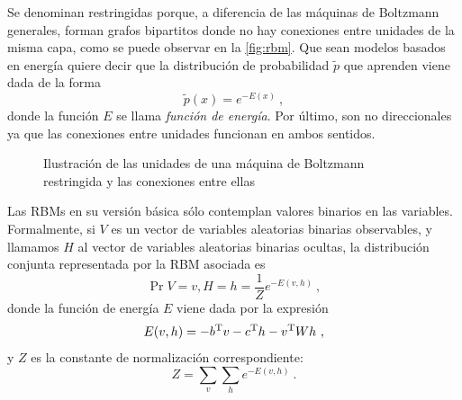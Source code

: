 Se denominan restringidas porque, a diferencia de las máquinas de Boltzmann generales, forman grafos bipartitos donde no hay conexiones entre unidades de la misma capa, como se puede observar en la \autoref{fig:rbm}. Que sean modelos basados en energía quiere decir que la distribución de probabilidad $\tilde p$ que aprenden viene dada de la forma
\[
  \tilde p(x)=e^{-E(x)}~,
\]
donde la función $E$ se llama \textit{función de energía}. Por último, son no direccionales ya que las conexiones entre unidades funcionan en ambos sentidos.

\begin{figure}[hbtp]
  \centering
  
  \caption[Máquina de Boltzmann restringida]{Ilustración de las unidades de una máquina de Boltzmann restringida y las conexiones entre ellas}
  \label{fig:rbm}
\end{figure}

Las RBMs en su versión básica sólo contemplan valores binarios en las variables. Formalmente, si $V$ es un vector de variables aleatorias binarias observables, y llamamos $H$ al vector de variables aleatorias binarias ocultas, la distribución conjunta representada por la RBM asociada es
\[
  \Pr{V=v,H=h}=\frac 1 Z e^{-E(v,h)}~,
\]
donde la función de energía $E$ viene dada por la expresión
\[
  E(v,h)=-b^{\mathrm{T}} v -c^{\mathrm{T}} h - v^{\mathrm{T}} W h~,
\]
y $Z$ es la constante de normalización correspondiente:
\[
Z=\sum_{v}\sum_{h}e^{-E(v,h)}~.
\]

